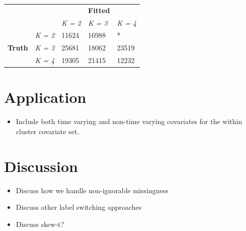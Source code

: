 \documentclass[useAMS,referee]{biom}
\begin{document}
\begin{table}[]
\centering
\begin{tabular}{lllll}
 &  &  & \textbf{Fitted} &  \\
 &  & \textit{K = 2} & \textit{K = 3} & \textit{K = 4} \\ \cline{3-5} 
 & \multicolumn{1}{l|}{\textit{K = 2}} & 11624 \multicolumn{1}{l|}{} & 16988 \multicolumn{1}{l|}{} & * \multicolumn{1}{l|}{} \\ \cline{3-5} 
\textbf{Truth} & \multicolumn{1}{l|}{\textit{K = 3}} & 25681 \multicolumn{1}{l|}{} & 18062 \multicolumn{1}{l|}{} & 23519 \multicolumn{1}{l|}{} \\ \cline{3-5} 
 & \multicolumn{1}{l|}{\textit{K = 4}} & 19305\multicolumn{1}{l|}{} & 21415 \multicolumn{1}{l|}{} & 12232 \multicolumn{1}{l|}{} \\ \cline{3-5} 
\end{tabular}
\end{table}

\newpage

\section{Application}
\label{s:app}

\begin{itemize}

\item Include both time varying and non-time varying covariates for the within cluster covariate set. 

\end{itemize}

\newpage

\section{Discussion}
\label{s:discuss}


\begin{itemize}

\item Discuss how we handle non-ignorable missingness 

\item Discuss other label switching approaches

\item Discuss skew-t?

\end{itemize}
\end{document}

